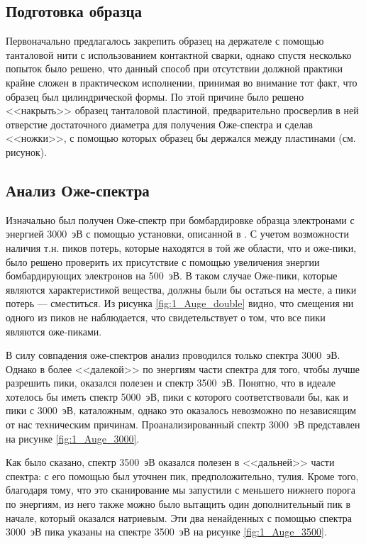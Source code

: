 \documentclass[a4paper, 12pt]{article}
\begin{document}
\subsection{Подготовка образца}

Первоначально предлагалось закрепить образец на держателе с помощью танталовой нити с использованием контактной сварки, однако спустя несколько попыток было решено, что данный способ при отсутствии должной практики крайне сложен в практическом исполнении, принимая во внимание тот факт, что образец был цилиндрической формы. По этой причине было решено <<накрыть>> образец танталовой пластиной, предварительно просверлив в ней отверстие достаточного диаметра для получения Оже-спектра и сделав <<ножки>>, с помощью которых образец бы держался между пластинами (см. рисунок). %


\subsection{Анализ Оже-спектра}

Изначально был получен Оже-спектр при бомбардировке образца электронами с энергией 3000~эВ с помощью установки, описанной в \cite{Auger_spectr}. С учетом возможности наличия т.н. пиков потерь, которые находятся в той же области, что и оже-пики, было решено проверить их присутствие с помощью увеличения энергии бомбардирующих электронов на 500~эВ. В таком случае Оже-пики, которые являются характеристикой вещества, должны были бы остаться на месте, а пики потерь --- сместиться. Из рисунка \ref{fig:1_Auge_double} видно, что смещения ни одного из пиков не наблюдается, что свидетельствует о том, что все пики являются оже-пиками.

В силу совпадения оже-спектров анализ проводился только спектра 3000~эВ. Однако в более <<далекой>> по энергиям части спектра для того, чтобы лучше разрешить пики, оказался полезен и спектр 3500~эВ. Понятно, что в идеале хотелось бы иметь спектр 5000~эВ, пики с которого соответствовали бы, как и пики с 3000~эВ, каталожным, однако это оказалось невозможно по независящим от нас техническим причинам. Проанализированный спектр 3000~эВ представлен на рисунке \ref{fig:1_Auge_3000}.

Как было сказано, спектр 3500~эВ оказался полезен в <<дальней>> части спектра: с его помощью был уточнен пик, предположительно, тулия. Кроме того, благодаря тому, что это сканирование мы запустили с меньшего нижнего порога по энергиям, из него также можно было вытащить один дополнительный пик в начале, который оказался натриевым. Эти два ненайденных с помощью спектра 3000~эВ пика указаны на спектре 3500~эВ на рисунке \ref{fig:1_Auge_3500}. 
\end{document}
